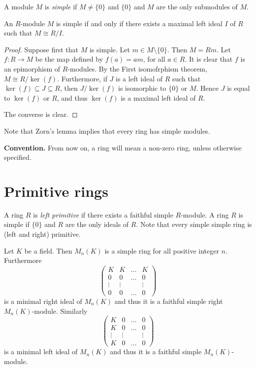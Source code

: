 A module $M$ is {\em simple} if $M\neq \{0\}$ and $\{0\}$ and $M$ are the only submodules of $M$.

\begin{lemma}\label{Lema 1.1.2}
An $R$-module $M$ is simple if and only if there exists a maximal left ideal $I$ of $R$ such that
$M\cong R/I$.
\end{lemma}

\begin{proof}
Suppose first that $M$ is simple. Let  $m\in M\setminus\{ 0\}$. Then $M=Rm$.
Let $f\colon R\rightarrow M$ be the map defined by $f(a)=am$, for all $a\in
R$. It is clear that $f$ is an epimorphism of $R$-modules. By the First isomofrphism theorem, $M\cong R/\ker(f)$. 
Furthermore, if $J$ is a left ideal of
$R$ such that $\ker(f)\subseteq J\subseteq R$, then
$J/\ker(f)$ is isomorphic to $\{0\}$ or $M$. Hence $J$ is equal to
$\ker(f)$ or $R$, and thus $\ker(f)$ is a maximal left ideal of $R$.

The converse is clear. 
\end{proof}

Note that Zorn's lemma implies that every ring has simple modules.

\bigskip

{\bf Convention.} From now on, a ring will mean a non-zero ring, unless otherwise specified. 
\bigskip

\section*{Primitive rings}

A ring $R$ is {\em left primitive} if there exists a faithful simple $R$-module. A ring $R$ is simple if $\{0\}$ and $R$ are the only ideals of $R$.
Note that every simple simple ring is (left and right) primitive.

\begin{example}
Let $K$ be a field. Then $M_n(K)$ is a simple ring for all positive integer $n$. Furthermore
$$\left(\begin{array}{cccc} K&K&\ldots&K\\
0&0&\ldots&0\\
\vdots &\vdots &&\vdots\\
0&0&\ldots&0\end{array}\right)$$
is a minimal right ideal of $M_n(K)$ and thus it is a faithful simple
right $M_n(K)$-module. Similarly
$$\left(\begin{array}{cccc} K&0&\ldots&0\\
	K&0&\ldots&0\\
	\vdots &\vdots &&\vdots\\
	K&0&\ldots&0\end{array}\right)$$
is a minimal left ideal of $M_n(K)$ and thus it is a faithful simple
$M_n(K)$-module. 
\end{example}

